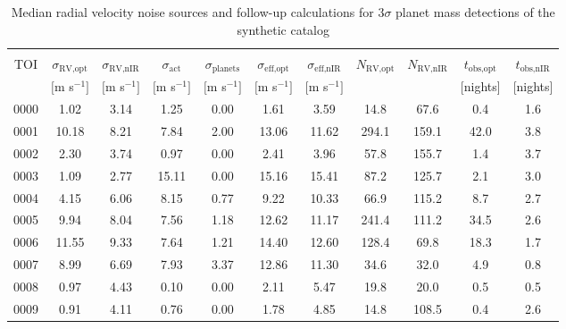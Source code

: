 \clearpage
\begin{landscape}
\begin{table*}
  \small
  \renewcommand{\arraystretch}{0.7}
  \caption{Median radial velocity noise sources and follow-up calculations for $3\sigma$ planet mass detections of the  synthetic catalog}
  \label{RVFCtable:results}
  \begin{tabular}{ccccccccccc}
    \hline \\ [-1ex]
    TOI & $ \sigma_{\text{RV},\text{opt}} $ & $ \sigma_{\text{RV},\text{nIR}} $ & $ \sigma_{\text{act}} $ & $ \sigma_{\text{planets}} $ & $ \sigma_{\text{eff,opt}} $ & $ \sigma_{\text{eff,nIR}} $ & $ N_{\text{RV,opt}} $ & $ N_{\text{RV,nIR}} $ & $ t_{\text{obs,opt}} $ & $ t_{\text{obs,nIR}} $ \\ & $[$m s$^{-1}]$ & $[$m s$^{-1}]$ & $[$m s$^{-1}]$ & $[$m s$^{-1}]$ & $[$m s$^{-1}]$ & $[$m s$^{-1}]$ & & & [nights] & [nights] \\
    \hline
0000 & 1.02 & 3.14 & 1.25 & 0.00 & 1.61 & 3.59 & 14.8 & 67.6 & 0.4 & 1.6 \\ 
0001 & 10.18 & 8.21 & 7.84 & 2.00 & 13.06 & 11.62 & 294.1 & 159.1 & 42.0 & 3.8 \\ 
0002 & 2.30 & 3.74 & 0.97 & 0.00 & 2.41 & 3.96 & 57.8 & 155.7 & 1.4 & 3.7 \\ 
0003 & 1.09 & 2.77 & 15.11 & 0.00 & 15.16 & 15.41 & 87.2 & 125.7 & 2.1 & 3.0 \\ 
0004 & 4.15 & 6.06 & 8.15 & 0.77 & 9.22 & 10.33 & 66.9 & 115.2 & 8.7 & 2.7 \\ 
0005 & 9.94 & 8.04 & 7.56 & 1.18 & 12.62 & 11.17 & 241.4 & 111.2 & 34.5 & 2.6 \\ 
0006 & 11.55 & 9.33 & 7.64 & 1.21 & 14.40 & 12.60 & 128.4 & 69.8 & 18.3 & 1.7 \\ 
0007 & 8.99 & 6.69 & 7.93 & 3.37 & 12.86 & 11.30 & 34.6 & 32.0 & 4.9 & 0.8 \\ 
0008 & 0.97 & 4.43 & 0.10 & 0.00 & 2.11 & 5.47 & 19.8 & 20.0 & 0.5 & 0.5 \\ 
0009 & 0.91 & 4.11 & 0.76 & 0.00 & 1.78 & 4.85 & 14.8 & 108.5 & 0.4 & 2.6 \\ 

\end{tabular}
\end{table*}
\end{landscape}
